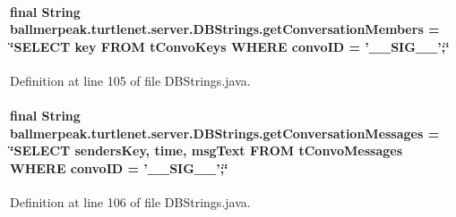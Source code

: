 \hypertarget{classballmerpeak_1_1turtlenet_1_1server_1_1DBStrings_adb5c2853326eef2b392ebcdf237c66b0}{
\paragraph[{get\-Conversation\-Members}]{\setlength{\rightskip}{0pt plus 5cm}final String ballmerpeak.\-turtlenet.\-server.\-D\-B\-Strings.\-get\-Conversation\-Members = \char`\"{}S\-E\-L\-E\-C\-T key F\-R\-O\-M t\-Convo\-Keys W\-H\-E\-R\-E convo\-I\-D = '\-\_\-\-\_\-\-S\-I\-G\-\_\-\-\_\-';\char`\"{}\hspace{0.3cm}{\ttfamily [static]}}}\label{classballmerpeak_1_1turtlenet_1_1server_1_1DBStrings_adb5c2853326eef2b392ebcdf237c66b0}


Definition at line 105 of file D\-B\-Strings.\-java.

\hypertarget{classballmerpeak_1_1turtlenet_1_1server_1_1DBStrings_a181d0ea3e7576342fa2c4d22fde126d8}{
\paragraph[{get\-Conversation\-Messages}]{\setlength{\rightskip}{0pt plus 5cm}final String ballmerpeak.\-turtlenet.\-server.\-D\-B\-Strings.\-get\-Conversation\-Messages = \char`\"{}S\-E\-L\-E\-C\-T senders\-Key, time, msg\-Text F\-R\-O\-M t\-Convo\-Messages W\-H\-E\-R\-E convo\-I\-D = '\-\_\-\-\_\-\-S\-I\-G\-\_\-\-\_\-';\char`\"{}\hspace{0.3cm}{\ttfamily [static]}}}\label{classballmerpeak_1_1turtlenet_1_1server_1_1DBStrings_a181d0ea3e7576342fa2c4d22fde126d8}


Definition at line 106 of file D\-B\-Strings.\-java.

